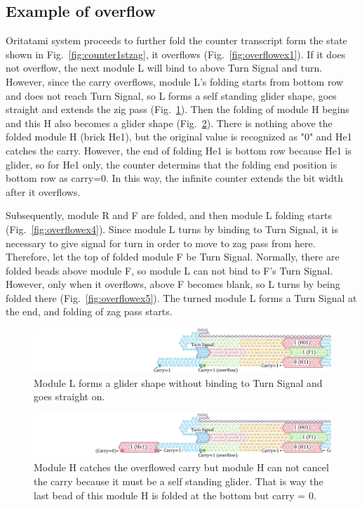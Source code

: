 \documentclass[runningheads]{llncs}
\begin{document}
\subsection{Example of overflow}
Oritatami system proceeds to further fold the counter transcript form the state shown in Fig.~\ref{fig:counter1stzag}, it overflows (Fig.~\ref{fig:overflowex1}).
If it does not overflow, the next module L will bind to above Turn Signal and turn.
However, since the carry overflows, module L's folding starts from bottom row and does not reach Turn Signal, so L forms a self standing glider shape, goes straight and extends the zig pass (Fig.~\ref{fig:overflowex2}).
Then the folding of module H begins and this H also becomes a glider shape (Fig.~\ref{fig:overflowex3}).
There is nothing above the folded module H (brick He1), but the original value is recognized as "0" and He1 catches the carry.
However, the end of folding He1 is bottom row because He1 is glider, so for He1 only, the counter determins that the folding end position is bottom row as carry=0.
In this way, the infinite counter extends the bit width after it overflows.

Subsequently, module R and F are folded, and then module L folding starts (Fig.~\ref{fig:overflowex4}).
Since module L turns by binding to Turn Signal, it is necessary to give signal for turn in order to move to zag pass from here.
Therefore, let the top of folded module F be Turn Signal.
Normally, there are folded beads above module F, so module L can not bind to F's Turn Signal.
However, only when it overflows, above F becomes blank, so L turns by being folded there (Fig.~\ref{fig:overflowex5}).
The turned module L forms a Turn Signal at the end, and folding of zag pass starts.


\begin{figure}[tb]
\centering
\includegraphics[width=\linewidth]{fig/svg/CounterEx14_1.pdf}
\caption{
Module L forms a glider shape without binding to Turn Signal and goes straight on. 
}
\label{fig:overflowex2}
\end{figure}

\begin{figure}[tb]
\centering
\includegraphics[width=\linewidth]{fig/svg/CounterEx15_1.pdf}
\caption{
Module H catches the overflowed carry but module H can not cancel the carry because it must be a self standing glider.
That is way the last bead of this module H is folded at the bottom but carry = 0. 
}
\label{fig:overflowex3}
\end{figure}
\end{document}
